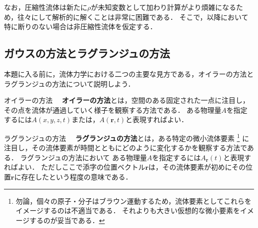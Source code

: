 \documentclass[uplatex,dvipdfmx,a4j,11pt]{jsreport}
\newcommand{\keyword}[1]{\textcolor{mainblue}{\textbf{#1}}}
\newcommand{\diff}{\mathrm{d}} %
\numberwithin{equation}{chapter}
\begin{document}
なお，圧縮性流体は新たに$\rho$が未知変数として加わり計算がより煩雑になるため，往々にして解析的に解くことは非常に困難である．
そこで，以降において特に断りのない場合は非圧縮性流体を仮定する．




\subsection{ガウスの方法とラグランジュの方法}
本題に入る前に，流体力学における二つの主要な見方である，オイラーの方法とラグランジュの方法について説明しよう．

\begin{definition}{オイラーの方法}{}{}
  　\keyword{オイラーの方法}とは，空間のある固定された一点に注目し，その点を流体が通過していく様子を観察する方法である．
  ある物理量$A$を指定するには$A(x,y,z,t)$または，$A(\mathbf{r},t)$と表現すればよい．
\end{definition}

\begin{definition}{ラグランジュの方法}{}{}
  　\keyword{ラグランジュの方法}とは，ある特定の微小流体要素
  \footnote{
  勿論，個々の原子・分子はブラウン運動するため，流体要素としてこれらをイメージするのは不適当である．
  それよりも大きい仮想的な微小要素をイメージするのが妥当である．
  }
  に注目し，その流体要素が時間とともにどのように変化するかを観察する方法である．
  ラグランジュの方法において
  ある物理量$A$を指定するには$A_{\mathbf{r}}(t)$と表現すればよい．
  ただしここで添字の位置ベクトル$\mathbf{r}$は，その流体要素が初めにその位置$\mathbf{r}$に存在したという程度の意味である．
\end{definition}
\end{document}
